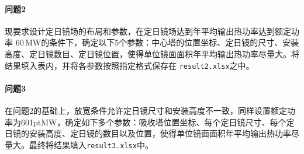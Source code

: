 \paragraph{问题2}
现要求设计定日镜场的布局和参数，在定日镜场达到年平均输出热功率达到额定功率 \(60 \, \mathrm{MW}\)的条件下，确定以下5个参数：中心塔的位置坐标、定日镜的尺寸、安装高度、定日镜数目、定日镜位置，使得单位镜面面积年平均输出热功率尽量大。将结果填入表内，并将各参数按照指定格式保存在 \texttt{result2.xlsx}之中。
\paragraph{问题3}
在问题2的基础上，放宽条件允许定日镜尺寸和安装高度不一致，同样设置额定功率为60\kern 1ptMW，确定如下多个参数：吸收塔位置坐标、每个定日镜尺寸、每个定日镜的安装高度、定日镜的数目以及位置，使得单位镜面面积年平均输出热功率尽量大。最终将结果填入\texttt{result3.xlsx}中。

